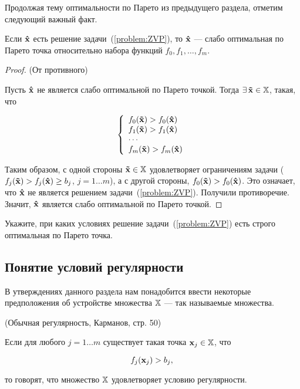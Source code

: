 Продолжая тему оптимальности по Парето из предыдущего раздела,
отметим следующий важный факт.

\begin{prop}\label{prop:x_weakoptimal}
Если $\mathbf{\hat x}$ есть решение задачи~(\ref{problem:ZVP}), то
$\mathbf{\hat x}$ --- слабо оптимальная по Парето точка относительно
набора функций $f_0, f_1, \ldots, f_m$.
\end{prop}

\begin{proof}(От противного)

Пусть $\mathbf{\hat x}$ не является слабо оптимальной по Парето точкой.
Тогда $\exists \,\mathbf{\tilde x} \in \mathbb{X}$, такая, что

\[
\left\{ \begin{array}{l}
 f_0(\mathbf{\tilde x}) > f_0(\mathbf{\hat x})\\
 f_1(\mathbf{\tilde x}) > f_1(\mathbf{\hat x})\\
  \cdots  \\
 f_m(\mathbf{\tilde x}) > f_m(\mathbf{\hat x}) \\
 \end{array} \right.
\]

\noindent Таким образом, с одной стороны $\mathbf{\tilde x}\in \mathbb{X}$
удовлетворяет ограничениям задачи ($f_j(\mathbf{\tilde x}) >
f_j(\mathbf{\hat x})\geq b_j$, $j=1 \ldots m$), а с другой стороны,
${f_0(\mathbf{\tilde x}) > f_0(\mathbf{\hat x})}$. Это означает, что
$\mathbf{\hat x}$ не является решением задачи~(\ref{problem:ZVP}).
Получили противоречие. Значит, $\mathbf{\hat x}$ является слабо
оптимальной по Парето точкой.
\end{proof}



\begin{exer}
Укажите, при каких условиях решение задачи~(\ref{problem:ZVP}) есть
строго оптимальная по Парето точка.
\end{exer}


\subsection{Понятие условий регулярности}

В утверждениях данного раздела нам понадобится ввести некоторые
предположения об устройстве множества $\mathbb{X}$ --- так называемые
 множества.

\begin{dfn}(Обычная регулярность, Карманов, стр. 50)

Если для любого $j=1 \ldots m$ существует такая точка $\mathbf{x}_j \in
\mathbb{X}$, что

\[
 f_j(\mathbf{x}_j) > b_j,\\
\]

\noindent то говорят, что множество $\mathbb{X}$ удовлетворяет условию
регулярности.

\end{dfn}



